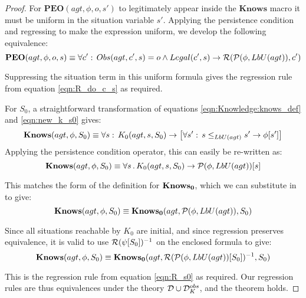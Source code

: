 \begin{proof}
For $\mathbf{PEO}(agt,\phi,o,s')$ to legitimately appear inside the
$\mathbf{Knows}$ macro it must be uniform in the situation variable
$s'$. Applying the persistence condition and regressing to make the
expression uniform, we develop the following equivalence:\[
\mathbf{PEO}(agt,\phi,o,s)\equiv\forall c':\, Obs(agt,c',s)=o\wedge Legal(c',s)\rightarrow\mathcal{R}(\mathcal{P}(\phi,LbU(agt)),c')\]


Suppressing the situation term in this uniform formula gives the regression
rule from equation \eqref{eqn:R_do_c_s} as required.

For $S_{0}$, a straightforward transformation of equations \eqref{eqn:Knowledge:knows_def}
and \eqref{eqn:new_k_s0} gives:\[
\mathbf{Knows}(agt,\phi,S_{0})\equiv\forall s:\, K_{0}(agt,s,S_{0})\rightarrow\left[\forall s':\, s\leq_{LbU(agt)}s'\rightarrow\phi[s']\right]\]
 Applying the persistence condition operator, this can easily be re-written
as:\[
\mathbf{Knows}(agt,\phi,S_{0})\equiv\forall s\,.\, K_{0}(agt,s,S_{0})\rightarrow\mathcal{P}(\phi,LbU(agt))[s]\]


This matches the form of the definition for $\mathbf{Knows_{0}}$, which we can
substitute in to give:\[
\mathbf{Knows}(agt,\phi,S_{0})\equiv\mathbf{Knows_{0}}(agt,\mathcal{P}(\phi,LbU(agt)),S_{0})\]


Since all situations reachable by $K_{0}$ are initial, and since
regression preserves equivalence, it is valid to use $\mathcal{R}(\psi[S_{0}])^{-1}$
on the enclosed formula to give:\[
\mathbf{Knows}(agt,\phi,S_{0})\equiv\mathbf{Knows_{0}}(agt,\mathcal{R}(\mathcal{P}(\phi,LbU(agt))[S_{0}])^{-1},S_{0})\]


This is the regression rule from equation \eqref{eqn:R_s0} as required.
Our regression rules are thus equivalences under the theory $\mathcal{D}\cup\mathcal{D}_{K}^{obs}$,
and the theorem holds. 
\end{proof}
\medskip{}


